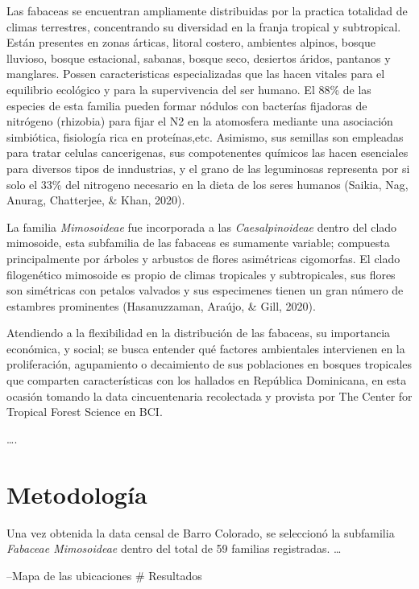 \documentclass[11pt,]{article}
\begin{document}
Las fabaceas se encuentran ampliamente distribuidas por la practica
totalidad de climas terrestres, concentrando su diversidad en la franja
tropical y subtropical. Están presentes en zonas árticas, litoral
costero, ambientes alpinos, bosque lluvioso, bosque estacional, sabanas,
bosque seco, desiertos áridos, pantanos y manglares. Possen
caracteristicas especializadas que las hacen vitales para el equilibrio
ecológico y para la supervivencia del ser humano. El 88\% de las
especies de esta familia pueden formar nódulos con bacterías fijadoras
de nitrógeno (rhizobia) para fijar el N2 en la atomosfera mediante una
asociación simbiótica, fisiología rica en proteínas,etc. Asimismo, sus
semillas son empleadas para tratar celulas cancerigenas, sus
compotenentes químicos las hacen esenciales para diversos tipos de
inndustrias, y el grano de las leguminosas representa por si solo el
33\% del nitrogeno necesario en la dieta de los seres humanos (Saikia,
Nag, Anurag, Chatterjee, \& Khan, 2020).

La familia \emph{Mimosoideae} fue incorporada a las
\emph{Caesalpinoideae} dentro del clado mimosoide, esta subfamilia de
las fabaceas es sumamente variable; compuesta principalmente por árboles
y arbustos de flores asimétricas cigomorfas. El clado filogenético
mimosoide es propio de climas tropicales y subtropicales, sus flores son
simétricas con petalos valvados y sus especimenes tienen un gran número
de estambres prominentes (Hasanuzzaman, Araújo, \& Gill, 2020).

Atendiendo a la flexibilidad en la distribución de las fabaceas, su
importancia económica, y social; se busca entender qué factores
ambientales intervienen en la proliferación, agupamiento o decaimiento
de sus poblaciones en bosques tropicales que comparten características
con los hallados en República Dominicana, en esta ocasión tomando la
data cincuentenaria recolectada y provista por The Center for Tropical
Forest Science en BCI.

\ldots.

\section{Metodología}\label{metodologuxeda}

Una vez obtenida la data censal de Barro Colorado, se seleccionó la
subfamilia \emph{Fabaceae Mimosoideae} dentro del total de 59 familias
registradas. \ldots

--Mapa de las ubicaciones \# Resultados
\end{document}
